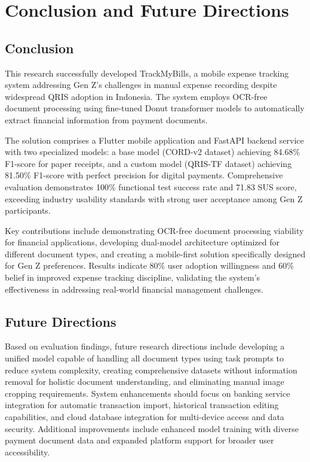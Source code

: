 \section{Conclusion and Future Directions}

\subsection{Conclusion}
This research successfully developed TrackMyBills, a mobile expense tracking system addressing Gen Z's challenges in manual expense recording despite widespread QRIS adoption in Indonesia. The system employs OCR-free document processing using fine-tuned Donut transformer models to automatically extract financial information from payment documents.

The solution comprises a Flutter mobile application and FastAPI backend service with two specialized models: a base model (CORD-v2 dataset) achieving 84.68\% F1-score for paper receipts, and a custom model (QRIS-TF dataset) achieving 81.50\% F1-score with perfect precision for digital payments. Comprehensive evaluation demonstrates 100\% functional test success rate and 71.83 SUS score, exceeding industry usability standards with strong user acceptance among Gen Z participants.

Key contributions include demonstrating OCR-free document processing viability for financial applications, developing dual-model architecture optimized for different document types, and creating a mobile-first solution specifically designed for Gen Z preferences. Results indicate 80\% user adoption willingness and 60\% belief in improved expense tracking discipline, validating the system's effectiveness in addressing real-world financial management challenges.

\subsection{Future Directions}
Based on evaluation findings, future research directions include developing a unified model capable of handling all document types using task prompts to reduce system complexity, creating comprehensive datasets without information removal for holistic document understanding, and eliminating manual image cropping requirements. System enhancements should focus on banking service integration for automatic transaction import, historical transaction editing capabilities, and cloud database integration for multi-device access and data security. Additional improvements include enhanced model training with diverse payment document data and expanded platform support for broader user accessibility.
